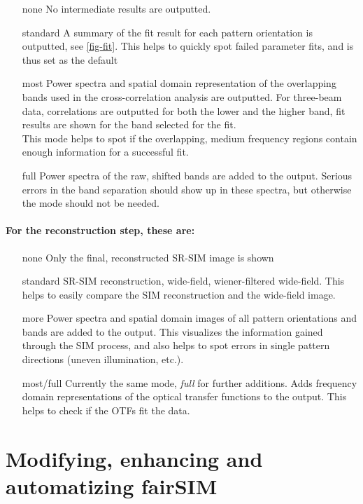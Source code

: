 \documentclass[twoside=false,
           twocolumn=false,
           a4paper,DIV=15,
           10pt]{scrartcl}
\begin{document}
\begin{itemize}
\item[none] No intermediate results are outputted.
\item[standard] A summary of the fit result
for each pattern orientation is outputted, see \cref{fig-fit}.
This helps to quickly spot failed parameter fits, and is thus
set as the default
\item[most]
Power spectra and spatial domain representation of the overlapping bands used
in the cross-correlation analysis are outputted. For three-beam data, correlations
are outputted for both the lower and the higher band, fit results are shown
for the band selected for the fit.\\
This mode helps to spot if the overlapping, medium frequency regions contain
enough information for a successful fit.
\item[full]
Power spectra of the raw, shifted bands are added to the output. Serious
errors in the band separation should show up in these spectra, but otherwise
the mode should not be needed.
\end{itemize}

\paragraph{For the reconstruction step, these are:}

\begin{itemize}
\item[none] Only the final, reconstructed SR-SIM image is shown
\item[standard] SR-SIM reconstruction, wide-field, wiener-filtered wide-field.
This helps to easily compare the SIM reconstruction and the wide-field image.
\item[more]
Power spectra and spatial domain images of all pattern orientations and bands
are added to the output. This visualizes the information gained through
the SIM process, and also helps to spot errors in single pattern 
directions (uneven illumination, etc.).
\item[most/full]
Currently the same mode, \textit{full} for further additions.
Adds frequency domain representations of the optical transfer functions
to the output. This helps to check if the OTFs fit the data.
\end{itemize}


\section{Modifying, enhancing and automatizing fairSIM}
\end{document}
